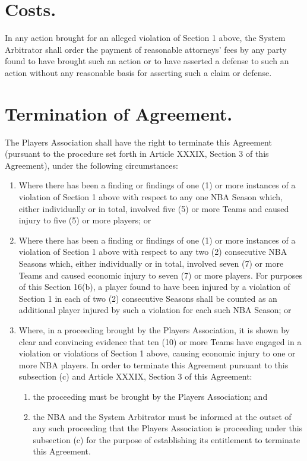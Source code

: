\documentclass[
]{book}
\providecommand{\tightlist}{%
  \setlength{\itemsep}{0pt}\setlength{\parskip}{0pt}}
\begin{document}
\hypertarget{costs.}{%
\section{Costs.}\label{costs.}}

In any action brought for an alleged violation of Section 1 above, the System Arbitrator shall order the payment of reasonable attorneys' fees by any party found to have brought such an action or to have asserted a defense to such an action without any reasonable basis for asserting such a claim or defense.

\hypertarget{termination-of-agreement.}{%
\section{Termination of Agreement.}\label{termination-of-agreement.}}

The Players Association shall have the right to terminate this Agreement (pursuant to the procedure set forth in Article XXXIX, Section 3 of this Agreement), under the following circumstances:

\begin{enumerate}
\def\labelenumi{(\alph{enumi})}
\tightlist
\item
  Where there has been a finding or findings of one (1) or more instances of a violation of Section 1 above with respect to any one NBA Season which, either individually or in total, involved five (5) or more Teams and caused injury to five (5) or more players; or
\item
  Where there has been a finding or findings of one (1) or more instances of a violation of Section 1 above with respect to any two (2) consecutive NBA Seasons which, either individually or in total, involved seven (7) or more Teams and caused economic injury to seven (7) or more players. For purposes of this Section 16(b), a player found to have been injured by a violation of Section 1 in each of two (2) consecutive Seasons shall be counted as an additional player injured by such a violation for each such NBA Season; or
\item
  Where, in a proceeding brought by the Players Association, it is shown by clear and convincing evidence that ten (10) or more Teams have engaged in a violation or violations of Section 1 above, causing economic injury to one or more NBA players. In order to terminate this Agreement pursuant to this subsection (c) and Article XXXIX, Section 3 of this Agreement:

  \begin{enumerate}
  \def\labelenumii{(\roman{enumii})}
  \tightlist
  \item
    the proceeding must be brought by the Players Association; and
  \item
    the NBA and the System Arbitrator must be informed at the outset of any such proceeding that the Players Association is proceeding under this subsection (c) for the purpose of establishing its entitlement to terminate this Agreement.
  \end{enumerate}
\end{enumerate}
\end{document}
